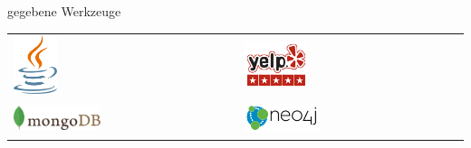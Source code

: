 \documentclass[12pt,usenames,dvipsnames]{beamer}
\begin{document}
		\begin{frame}{gegebene Werkzeuge}
		\begin{table}[]
\begin{tabular}{ll}
\includegraphics[width=0.2\textwidth]{java}  & \includegraphics[width=0.3\textwidth]{yelp} \\
\includegraphics[width=0.4\textwidth]{mongodb}  & \includegraphics[width=0.35\textwidth]{neo4j}
\end{tabular}
\end{table}
	\end{frame}
\end{document}
